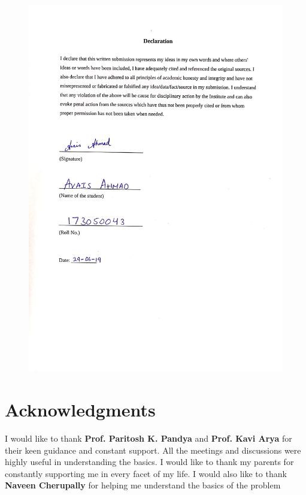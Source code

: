 \documentclass[16pt]{report}
\begin{document}
\begin{figure}[H]
\centering
\includegraphics[width=\linewidth]{dissertation1.jpg}
\end{figure}


\section*{Acknowledgments}
I would like to thank \textbf{Prof. Paritosh K. Pandya} and \textbf{Prof. Kavi Arya} for their keen guidance and constant support. All the meetings and discussions were highly useful in understanding the basics. I would like to thank my parents for constantly supporting me in every facet of my life. I would also like to thank \textbf{Naveen Cherupally}  for helping me understand the basics of the problem \newpage

\thispagestyle{empty}
\end{document}
